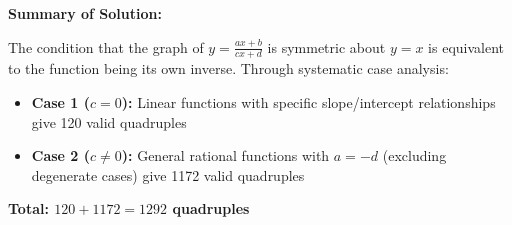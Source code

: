 \documentclass[12pt]{article}
\begin{document}
\begin{center}
\end{center}

\vspace{0.5cm}

\textbf{Summary of Solution:}

The condition that the graph of $y = \frac{ax+b}{cx+d}$ is symmetric about $y=x$ is equivalent to the function being its own inverse. Through systematic case analysis:

\begin{itemize}
    \item \textbf{Case 1 ($c=0$):} Linear functions with specific slope/intercept relationships give 120 valid quadruples
    \item \textbf{Case 2 ($c \neq 0$):} General rational functions with $a=-d$ (excluding degenerate cases) give 1172 valid quadruples
\end{itemize}

\textbf{Total: $120 + 1172 = \boxed{1292}$ quadruples}
\end{document}
